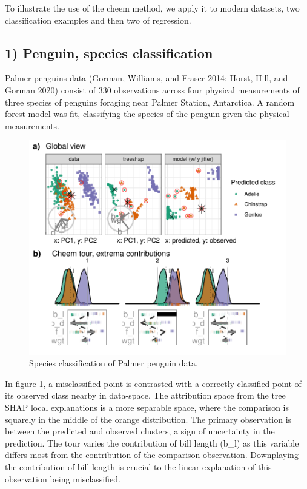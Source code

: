 \documentclass[
  article]{article}
\begin{document}
To illustrate the use of the cheem method, we apply it to modern datasets, two classification examples and then two of regression.

\hypertarget{penguin-species-classification}{%
\subsection{1) Penguin, species classification}\label{penguin-species-classification}}

Palmer penguins data (Gorman, Williams, and Fraser 2014; Horst, Hill, and Gorman 2020) consist of 330 observations across four physical measurements of three species of penguins foraging near Palmer Station, Antarctica. A random forest model was fit, classifying the species of the penguin given the physical measurements.

\begin{figure}

{\centering \includegraphics[width=1\linewidth]{./figures/case_penguins} 

}

\caption{Species classification of Palmer penguin data.}\label{fig:casepenguins}
\end{figure}

In figure \ref{fig:casepenguins}, a misclassified point is contrasted with a correctly classified point of its observed class nearby in data-space. The attribution space from the tree SHAP local explanations is a more separable space, where the comparison is squarely in the middle of the orange distribution. The primary observation is between the predicted and observed clusters, a sign of uncertainty in the prediction. The tour varies the contribution of bill length (b\_l) as this variable differs most from the contribution of the comparison observation. Downplaying the contribution of bill length is crucial to the linear explanation of this observation being misclassified.
\end{document}
